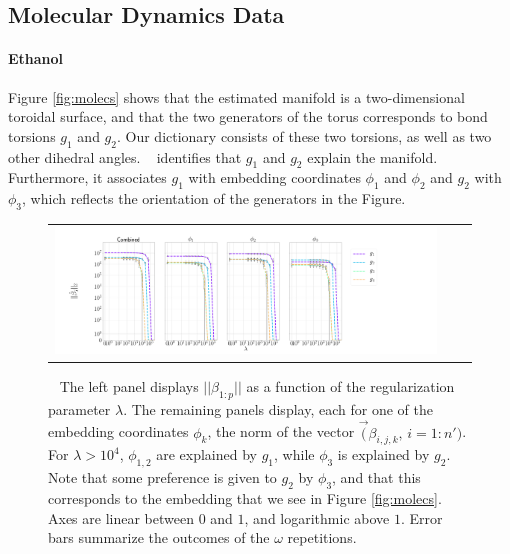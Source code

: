 {\subsection{Molecular Dynamics Data}\label{sec:mds_data}

\paragraph{Ethanol}\label{sec:ethanol}

Figure \ref{fig:molecs} shows that the estimated manifold is a two-dimensional toroidal surface, and that the two generators of the torus corresponds to bond torsions $g_1$ and $g_2$.  Our dictionary consists of these two torsions, as well as two other dihedral angles. \ouralg~ identifies that $g_1$ and $g_2$ explain the manifold. Furthermore, it associates $g_1$ with embedding coordinates $\phi_1$ and $\phi_2$ and $g_2$ with $\phi_3$, which reflects the orientation of the generators in the Figure.

%
\begin{figure}[H]
\setlength{\picwi}{0.3\llw}
\begin{tabular}{ccc}
\includegraphics[width=4\picwi,height=1.5\picwi]{../Figures/ethanol/June_27_2019_17_17_08/betassymlogsymlogbeta_paths_n50000nsel100nreps5.png}
\end{tabular}
\caption{\ethdata~ The left panel displays $||\beta_{1:p}||$ as a function of the regularization parameter $\lambda$. The remaining panels display, each for one of the embedding coordinates $\phi_k$, the norm of the vector $\vec(\beta_{i,j,k},\,i=1:n')$. For $\lambda > 10^4$, $\phi_{1,2}$ are explained by $g_1$, while $\phi_3$ is explained by $g_2$. Note that some preference is given to $g_2$ by $\phi_3$, and that this corresponds to the embedding that we see in Figure \ref{fig:molecs}. Axes are linear between $0$ and $1$, and logarithmic above $1$. Error bars summarize the outcomes of the $\omega$ repetitions.
}
\label{fig:mds-ethanol}  
\end{figure}

}
